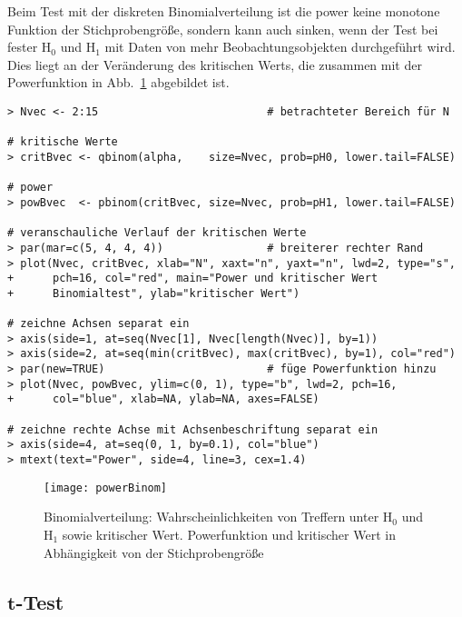 Beim Test mit der diskreten Binomialverteilung ist die power keine monotone Funktion der Stichprobengröße, sondern kann auch sinken, wenn der Test bei fester $\text{H}_{0}$ und $\text{H}_{1}$ mit Daten von mehr Beobachtungsobjekten durchgeführt wird. Dies liegt an der Veränderung des kritischen Werts, die zusammen mit der Powerfunktion in Abb.\ \ref{fig:powerBinom} abgebildet ist.
\begin{lstlisting}
> Nvec <- 2:15                          # betrachteter Bereich für N

# kritische Werte
> critBvec <- qbinom(alpha,    size=Nvec, prob=pH0, lower.tail=FALSE)

# power
> powBvec  <- pbinom(critBvec, size=Nvec, prob=pH1, lower.tail=FALSE)

# veranschauliche Verlauf der kritischen Werte
> par(mar=c(5, 4, 4, 4))                # breiterer rechter Rand
> plot(Nvec, critBvec, xlab="N", xaxt="n", yaxt="n", lwd=2, type="s",
+      pch=16, col="red", main="Power und kritischer Wert
+      Binomialtest", ylab="kritischer Wert")

# zeichne Achsen separat ein
> axis(side=1, at=seq(Nvec[1], Nvec[length(Nvec)], by=1))
> axis(side=2, at=seq(min(critBvec), max(critBvec), by=1), col="red")
> par(new=TRUE)                         # füge Powerfunktion hinzu
> plot(Nvec, powBvec, ylim=c(0, 1), type="b", lwd=2, pch=16,
+      col="blue", xlab=NA, ylab=NA, axes=FALSE)

# zeichne rechte Achse mit Achsenbeschriftung separat ein
> axis(side=4, at=seq(0, 1, by=0.1), col="blue")
> mtext(text="Power", side=4, line=3, cex=1.4)
\end{lstlisting}

\begin{figure}[ht]
\centering
\texttt{[image: powerBinom]}
\vspace*{-0.5em}
\caption{Binomialverteilung: Wahrscheinlichkeiten von Treffern unter $\text{H}_{0}$ und $\text{H}_{1}$ sowie kritischer Wert. Powerfunktion und kritischer Wert in Abhängigkeit von der Stichprobengröße}
\label{fig:powerBinom}
\end{figure}

\subsection[\texorpdfstring{$t$}{t}-Test]{$\bm{t}$-Test}

